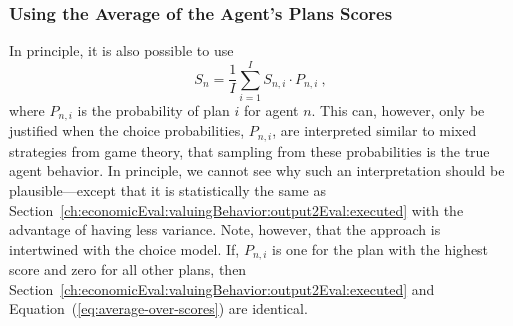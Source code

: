 %

\subsubsection{Using the Average of the Agent's Plans Scores}
\label{ch:economicEval:valuingBehavior:output2Eval:average}
In principle, it is also possible to use
%
\begin{equation}
S_n = \frac{1}{I} \sum_{i=1}^I S_{n,i} \cdot P_{n,i} \ ,
\label{eq:average-over-scores}
\end{equation}
%
where $P_{n,i}$ is the probability of plan $i$ for agent $n$. This can, however, only be justified when the choice probabilities, $P_{n,i}$, are interpreted similar to mixed strategies from game theory, \ie that sampling from these probabilities is the true agent behavior.  In principle, we cannot see why such an interpretation should be plausible---except that it is statistically the same as Section~\ref{ch:economicEval:valuingBehavior:output2Eval:executed} with the advantage of having less variance.  Note, however, that the approach is intertwined with the choice model. If, \eg $P_{n,i}$ is one for the plan with the highest score and zero for all other plans, then Section~\ref{ch:economicEval:valuingBehavior:output2Eval:executed} and Equation~(\ref{eq:average-over-scores}) are identical.  



